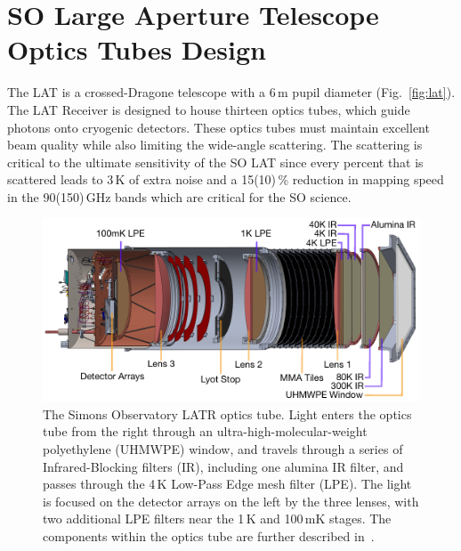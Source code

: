 \section{SO Large Aperture Telescope Optics Tubes Design}
\label{sec:optics_tube}

The LAT is a crossed-Dragone telescope with a 6\,m pupil diameter (Fig.~\ref{fig:lat}).  The LAT Receiver is designed to house thirteen optics tubes, which guide photons onto cryogenic detectors.  These optics tubes must maintain excellent beam quality while also limiting the wide-angle scattering.  The scattering is critical to the ultimate sensitivity of the SO LAT since every percent that is scattered leads to 3\,K of extra noise and a 15(10)\,\% reduction in mapping speed in the 90(150)\,GHz bands which are critical for the SO science.

\begin{figure}
    \centering
    \includegraphics[width = .9\textwidth]{Figures/LATR_OT_Tester_20190221_3.pdf}
    \caption{The Simons Observatory LATR optics tube.  Light enters the optics tube from the right through an ultra-high-molecular-weight polyethylene (UHMWPE) window, and travels through a series of Infrared-Blocking filters (IR), including one alumina IR filter, and passes through the 4\,K Low-Pass Edge mesh filter (LPE). The light is focused on the detector arrays on the left by the three lenses, with two additional LPE filters near the 1\,K and 100\,mK stages.  The components within the optics tube are further described in~\cite{xu/etal:2020c}.}
    \label{fig:latrt}
\end{figure}


